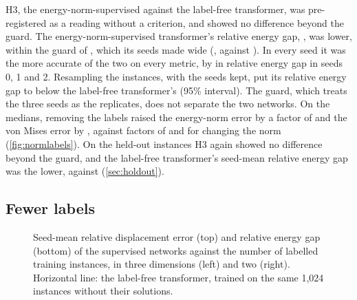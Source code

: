 H3, the energy-norm-supervised against the label-free transformer, was pre-registered as a
reading without a criterion, and showed no difference beyond the guard. The
energy-norm-supervised transformer's relative energy gap, \numCmKnormGap{}, was
\numHThreeRel{} lower, within the guard of \numHThreeTau{}, which its seeds made wide
(\numCmKnormGapSeeds{}, against \numCmFreeGapSeeds{}). In every seed it was the more
accurate of the two on every metric, by \numHThreeSeedRel{} in relative energy gap in seeds 0, 1 and 2. Resampling the instances, with the seeds kept, put
its relative energy gap \numHThreeResLow{} to \numHThreeResHigh{} below the label-free
transformer's (95\% interval). The guard, which treats the three seeds as the replicates, does not separate the
two networks. On the medians, removing the labels raised the energy-norm error by a factor
of \numNlCmLabelE{} and the von Mises error by \numNlCmLabelVm{}, against factors of
\numNlCmNormE{} and \numNlCmNormVm{} for changing the norm (\cref{fig:normlabels}). On the
held-out instances H3 again showed no difference beyond the guard, and the label-free
transformer's seed-mean relative energy gap was the lower, \numHoldTwoFreeGap{} against
\numHoldTwoKnormGap{} (\cref{sec:holdout}).

\subsection{Fewer labels}\label{sec:labelfree:budget}

\begin{figure}[tbp]
\centering
{}
\caption{Seed-mean relative displacement error (top) and relative energy gap (bottom) of the
supervised networks against the number of labelled training instances, in three dimensions
(left) and two (right). Horizontal line: the label-free transformer, trained on the same
1,024 instances without their solutions.}
\label{fig:labeleff}
\end{figure}

